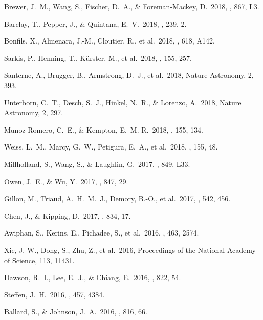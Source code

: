  Brewer, J.~M., Wang, S., Fischer, D.~A., \& Foreman-Mackey, D.\ 2018, \apjl, 867, L3.

 Barclay, T., Pepper, J., \& Quintana, E.~V.\ 2018, \apjs, 239, 2.

 Bonfils, X., Almenara, J.-M., Cloutier, R., et al.\ 2018, \aap, 618, A142.

 Sarkis, P., Henning, T., K{\"u}rster, M., et al.\ 2018, \aj, 155, 257.

 Santerne, A., Brugger, B., Armstrong, D.~J., et al.\ 2018, Nature Astronomy, 2, 393.

 Unterborn, C.~T., Desch, S.~J., Hinkel, N.~R., \& Lorenzo, A.\ 2018, Nature Astronomy, 2, 297.

 Munoz Romero, C.~E., \& Kempton, E.~M.-R.\ 2018, \aj, 155, 134.

 Weiss, L.~M., Marcy, G.~W., Petigura, E.~A., et al.\ 2018, \aj, 155, 48.

 Millholland, S., Wang, S., \& Laughlin, G.\ 2017, \apjl, 849, L33.

 Owen, J.~E., \& Wu, Y.\ 2017, \apj, 847, 29.

 Gillon, M., Triaud, A.~H.~M.~J., Demory, B.-O., et al.\ 2017, \nat, 542, 456.

 Chen, J., \& Kipping, D.\ 2017, \apj, 834, 17.

 Awiphan, S., Kerins, E., Pichadee, S., et al.\ 2016, \mnras, 463, 2574.

 Xie, J.-W., Dong, S., Zhu, Z., et al.\ 2016, Proceedings of the National Academy of Science, 113, 11431.

 Dawson, R.~I., Lee, E.~J., \& Chiang, E.\ 2016, \apj, 822, 54.

 Steffen, J.~H.\ 2016, \mnras, 457, 4384.

 Ballard, S., \& Johnson, J.~A.\ 2016, \apj, 816, 66.

